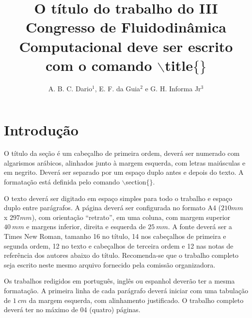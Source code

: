 \documentclass[a4paper,12pt]{article}
\begin{document}
\title{O título do trabalho do III Congresso de Fluidodinâmica Computacional 
deve ser escrito com o comando $\backslash$\MakeLowercase{title}$\{\}$}

\author{A. B. C. Dario$^{1}$, E. F. da Guia$^{2}$ e G. H. Informa Jr$^{3}$}

\address{
$^{1}$ Universidade Estadual de Campinas,
       Faculdade de Engenharia Química \\
$^{2}$ Universidade Federal de Campina Grande,
       Departamento de Engenharia de Materiais \\
$^{3}$ Universidade Federal do Rio de Janeiro,
       Escola de Química \\
}


\section{Introdução}
O título da seção é um cabeçalho de primeira ordem, deverá ser numerado
com algarismos arábicos, alinhados junto à margem esquerda, com letras
maiúsculas e em negrito. Deverá ser separado por um espaço duplo antes
e depois do texto. A formatação está definida pelo comando
$\backslash$section$\{\}$.

O texto deverá ser digitado em espaço simples para todo o trabalho e
espaço duplo entre parágrafos. A página deverá ser configurada no
formato A4 ($210mm$ x $297mm$), com orientação ``retrato'', em uma
coluna, com margem superior $40~mm$ e margens inferior, direita e
esquerda de $25~mm$. A fonte deverá ser a Times New Roman, tamanho 16
no título, 14 nos cabeçalhos de primeira e segunda ordem, 12 no texto
e cabeçalhos de terceira ordem e 12 nas notas de referência dos autores
abaixo do título. Recomenda-se que o trabalho completo seja escrito
neste mesmo arquivo fornecido pela comissão organizadora.

Os trabalhos redigidos em português, inglês ou espanhol deverão ter a
mesma formatação. A primeira linha de cada parágrafo deverá iniciar com
uma tabulação de $1~cm$ da margem esquerda, com alinhamento justificado.
O trabalho completo deverá ter no máximo de 04 (quatro) páginas.
\end{document}
